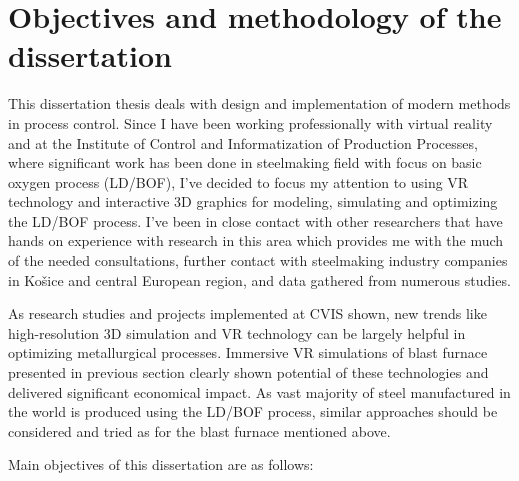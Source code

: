 \section{Objectives and methodology of the dissertation}
This dissertation thesis deals with design and implementation of modern methods in process control. Since I have been working professionally with virtual reality and at the Institute of Control and Informatization of Production Processes, where significant work has been done in steelmaking field with focus on basic oxygen process (LD/BOF), I've decided to focus my attention to using VR technology and interactive 3D graphics for modeling, simulating and optimizing the LD/BOF process. I've been in close contact with other researchers that have hands on experience with research in this area \citep{Kacur2019,Sprava2018} which provides me with the much of the needed consultations, further contact with steelmaking industry companies in Košice and central European region, and data gathered from numerous studies.

As research studies and projects implemented at CVIS shown, new trends like high-resolution 3D simulation and VR technology can be largely helpful in optimizing metallurgical processes. Immersive VR simulations of blast furnace presented in previous section clearly shown potential of these technologies and delivered significant economical impact. As vast majority of steel manufactured in the world is produced using the LD/BOF process, similar approaches should be considered and tried as for the blast furnace mentioned above. 

Main objectives of this dissertation are as follows:

